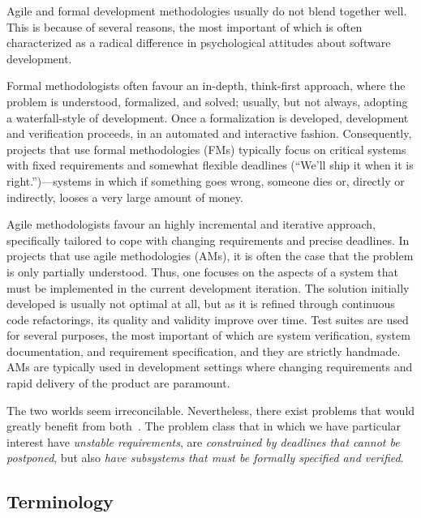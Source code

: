 \documentclass[english]{lni}
\begin{document}

Agile and formal development methodologies
usually do not blend together well.  This is because of several
reasons, the most important of which is often characterized as a
radical difference in psychological attitudes about software
development.  

Formal methodologists often favour an in-depth, think-first approach,
where the problem is understood, formalized, and solved; usually, but
not always, adopting a waterfall-style of development.  Once a
formalization is developed, development and verification proceeds, in
an automated and interactive fashion.  Consequently, projects that use
formal methodologies (FMs) typically focus on critical systems with
fixed requirements and somewhat flexible deadlines (``We'll ship it
when it is right.'')---systems in which if something goes wrong,
someone dies or, directly or indirectly, looses a very large amount of
money.

Agile methodologists favour an highly incremental and iterative
approach, specifically tailored to cope with changing requirements and
precise deadlines.  In projects that use agile methodologies (AMs), it is
often the case that the problem is only partially understood.  Thus,
one focuses on the aspects of a system that must be implemented in the
current development iteration.  The solution initially developed is
usually not optimal at all, but as it is refined through continuous
code refactorings, its quality and validity improve over time.  Test
suites are used for several purposes, the most important of which are
system verification, system documentation, and requirement
specification, and they are strictly handmade.  AMs are typically used
in development settings where changing requirements and rapid delivery
of the product are paramount.


The two worlds seem irreconcilable.  Nevertheless, there exist
problems that would greatly benefit from both~\cite{Black2009}.  The
problem class that in which we have particular interest have
\emph{unstable requirements}, are \emph{constrained by deadlines that
  cannot be postponed}, but also \emph{have subsystems that must be
  formally specified and verified}.


\subsection{Terminology}
\label{sec:terminology}
\end{document}
